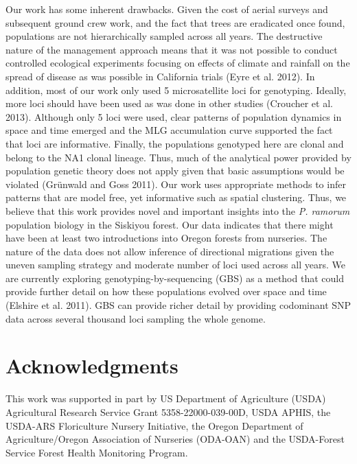 \documentclass[double,12pt]{beavtex}
\begin{document}
  Our work has some inherent drawbacks. Given the cost of aerial surveys
  and subsequent ground crew work, and the fact that trees are eradicated
  once found, populations are not hierarchically sampled across all years.
  The destructive nature of the management approach means that it was not
  possible to conduct controlled ecological experiments focusing on
  effects of climate and rainfall on the spread of disease as was possible
  in California trials (Eyre et al. 2012). In addition, most of our work
  only used 5 microsatellite loci for genotyping. Ideally, more loci
  should have been used as was done in other studies (Croucher et al.
  2013). Although only 5 loci were used, clear patterns of population
  dynamics in space and time emerged and the MLG accumulation curve
  supported the fact that loci are informative. Finally, the populations
  genotyped here are clonal and belong to the NA1 clonal lineage. Thus,
  much of the analytical power provided by population genetic theory does
  not apply given that basic assumptions would be violated (Grünwald and
  Goss 2011). Our work uses appropriate methods to infer patterns that are
  model free, yet informative such as spatial clustering. Thus, we believe
  that this work provides novel and important insights into the \emph{P.
  ramorum} population biology in the Siskiyou forest. Our data indicates
  that there might have been at least two introductions into Oregon
  forests from nurseries. The nature of the data does not allow inference
  of directional migrations given the uneven sampling strategy and
  moderate number of loci used across all years. We are currently
  exploring genotyping-by-sequencing (GBS) as a method that could provide
  further detail on how these populations evolved over space and time
  (Elshire et al. 2011). GBS can provide richer detail by providing
  codominant SNP data across several thousand loci sampling the whole
  genome.
  
  \section{Acknowledgments}\label{acknowledgments}
  
  This work was supported in part by US Department of Agriculture (USDA)
  Agricultural Research Service Grant 5358-22000-039-00D, USDA APHIS, the
  USDA-ARS Floriculture Nursery Initiative, the Oregon Department of
  Agriculture/Oregon Association of Nurseries (ODA-OAN) and the
  USDA-Forest Service Forest Health Monitoring Program.
  
\end{document}
